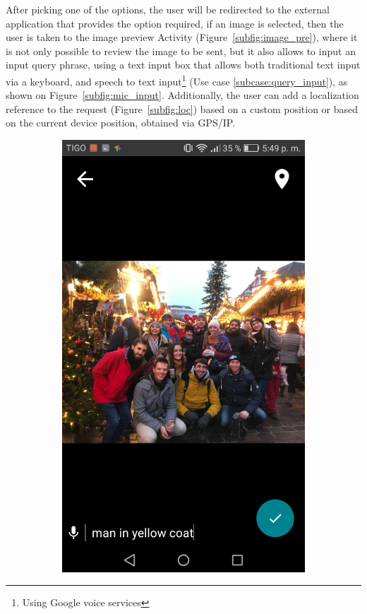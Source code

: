 After picking one of the options, the user will be redirected to the external application that provides the option required, if an image is selected, then the user is taken to the image preview Activity (Figure~\ref{subfig:image_pre}), where it is not only possible to review the image to be sent, but it also allows to input an input query phrase, using a text input box that allows both traditional text input via a keyboard, and speech to text input\footnote{Using Google voice services} (Use case \ref{subcase:query_input}), as shown on Figure~\ref{subfig:mic_input}. Additionally, the user can add a localization reference to the request (Figure~\ref{subfig:loc}) based on a custom position or based on the current device position, obtained via GPS/IP.

\begin{figure}[!htbp]
    \centering
    \begin{multicols}{3}
    \begin{subfigure}[b]{\columnwidth}
            \centering
            \includegraphics[width=\textwidth]{./figures/dmn_app/views/3.png}

\end{subfigure}
\end{multicols}
\end{figure}
